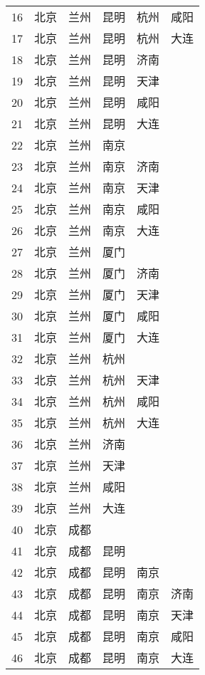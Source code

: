 \begin{footnotesize}
\begin{longtable}{cccccc}
        16	& 北京  & 兰州  & 昆明  & 杭州  & 咸阳 \\
        17	& 北京  & 兰州  & 昆明  & 杭州  & 大连 \\
        18	& 北京  & 兰州  & 昆明  & 济南 \\
        19	& 北京  & 兰州  & 昆明  & 天津 \\
        20	& 北京  & 兰州  & 昆明  & 咸阳 \\
        21	& 北京  & 兰州  & 昆明  & 大连 \\
        22	& 北京  & 兰州  & 南京 \\
        23	& 北京  & 兰州  & 南京  & 济南 \\
        24	& 北京  & 兰州  & 南京  & 天津 \\
        25	& 北京  & 兰州  & 南京  & 咸阳 \\
        26	& 北京  & 兰州  & 南京  & 大连 \\
        27	& 北京  & 兰州  & 厦门 \\
        28	& 北京  & 兰州  & 厦门  & 济南 \\
        29	& 北京  & 兰州  & 厦门  & 天津 \\
        30	& 北京  & 兰州  & 厦门  & 咸阳 \\
        31	& 北京  & 兰州  & 厦门  & 大连 \\
        32	& 北京  & 兰州  & 杭州 \\
        33	& 北京  & 兰州  & 杭州  & 天津 \\
        34	& 北京  & 兰州  & 杭州  & 咸阳 \\
        35	& 北京  & 兰州  & 杭州  & 大连 \\
        36	& 北京  & 兰州  & 济南 \\
        37	& 北京  & 兰州  & 天津 \\
        38	& 北京  & 兰州  & 咸阳 \\
        39	& 北京  & 兰州  & 大连 \\
        40	& 北京  & 成都 \\
        41	& 北京  & 成都  & 昆明 \\
        42	& 北京  & 成都  & 昆明  & 南京 \\
        43	& 北京  & 成都  & 昆明  & 南京  & 济南 \\
        44	& 北京  & 成都  & 昆明  & 南京  & 天津 \\
        45	& 北京  & 成都  & 昆明  & 南京  & 咸阳 \\
        46	& 北京  & 成都  & 昆明  & 南京  & 大连 \\

\end{longtable}
\end{footnotesize}
